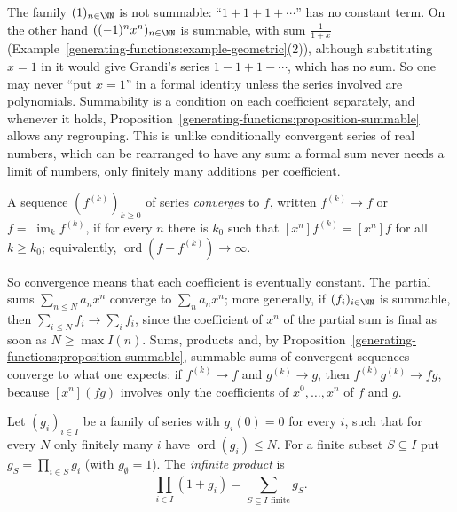 \begin{counterexample}\label{generating-functions:counterexample-not-summable}
The family $(1)_{n \in \NN}$ is not summable: ``$1 + 1 + 1 + \cdots$'' has no constant term. On the other hand $((-1)^nx^n)_{n \in \NN}$ is summable, with sum $\frac{1}{1 + x}$
(Example~\ref{generating-functions:example-geometric}(2)), although substituting $x = 1$ in it would give Grandi's series $1 - 1 + 1 - \cdots$, which has no sum. So one may never ``put $x = 1$'' in a
formal identity unless the series involved are polynomials. Summability is a condition on each coefficient separately, and whenever it holds,
Proposition~\ref{generating-functions:proposition-summable} allows any regrouping. This is unlike conditionally convergent series of real numbers, which can be rearranged to have any sum: a formal
sum never needs a limit of numbers, only finitely many additions per coefficient.
\end{counterexample}

\begin{definition}\label{generating-functions:definition-convergence}
A sequence $(f^{(k)})_{k \geq 0}$ of series \emph{converges} to $f$, written $f^{(k)} \to f$ or $f = \lim_kf^{(k)}$, if for every $n$ there is $k_0$ such that $[x^n]f^{(k)} = [x^n]f$ for all
$k \geq k_0$; equivalently, $\operatorname{ord}(f - f^{(k)}) \to \infty$.
\end{definition}

So convergence means that each coefficient is eventually constant. The partial sums $\sum_{n \leq N}a_nx^n$ converge to $\sum_na_nx^n$; more generally, if $(f_i)_{i \in \NN}$ is summable, then
$\sum_{i \leq N}f_i \to \sum_if_i$, since the coefficient of $x^n$ of the partial sum is final as soon as $N \geq \max I(n)$. Sums, products and, by
Proposition~\ref{generating-functions:proposition-summable}, summable sums of convergent sequences converge to what one expects: if $f^{(k)} \to f$ and $g^{(k)} \to g$, then
$f^{(k)}g^{(k)} \to fg$, because $[x^n](fg)$ involves only the coefficients of $x^0, \ldots, x^n$ of $f$ and $g$.

\begin{definition}\label{generating-functions:definition-infinite-product}
Let $(g_i)_{i \in I}$ be a family of series with $g_i(0) = 0$ for every $i$, such that for every $N$ only finitely many $i$ have $\operatorname{ord}(g_i) \leq N$. For a finite subset $S \subseteq I$
put $g_S = \prod_{i \in S}g_i$ (with $g_\emptyset = 1$). The \emph{infinite product} is
\[
\prod_{i \in I}(1 + g_i) = \sum_{S \subseteq I \text{ finite}}g_S.
\]
\end{definition}

